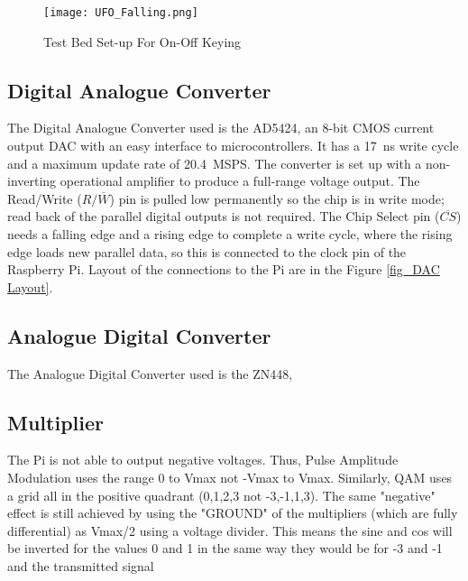 \documentclass[../main.tex]{subfiles}
\begin{document}

\begin{figure}[ht]
	\centering
	\texttt{[image: UFO\_Falling.png]}
	\caption{Test Bed Set-up For On-Off Keying}
	\label{fig_OOK Architecture}
\end{figure}

\subsection{Digital Analogue Converter}

The Digital Analogue Converter used is the AD5424, an 8-bit CMOS current output DAC with an easy interface to microcontrollers.
It has a \SI{17}{\nano\second} write cycle and a maximum update rate of \SI{20.4}{MSPS}. %
The converter is set up with a non-inverting operational amplifier to produce a full-range voltage output.
The Read/Write ($R/\overline{W}$) pin is pulled low permanently so the chip is in write mode; read back of the parallel digital outputs is not required.
The Chip Select pin ($\overline{CS}$) needs a falling edge and a rising edge to complete a write cycle, where the rising edge loads new parallel data, so this is connected to the clock pin of the Raspberry Pi.
Layout of the connections to the Pi are in the Figure \ref{fig_DAC Layout}.\\

 \label{fig_DAC Layout}

\subsection{Analogue Digital Converter}

The Analogue Digital Converter used is the ZN448, 


\subsection{Multiplier} \label{sec_Multiplier}
The Pi is not able to output negative voltages. Thus, Pulse Amplitude Modulation
uses the range 0 to Vmax not -Vmax to Vmax. Similarly, QAM uses a grid all in
the positive quadrant (0,1,2,3 not -3,-1,1,3). The same "negative" effect is still
achieved by using the "GROUND" of the multipliers (which are fully differential)
as Vmax/2 using a voltage divider. This means the sine and cos will be inverted
for the values 0 and 1 in the same way they would be for -3 and -1 and the
transmitted signal
\end{document}
